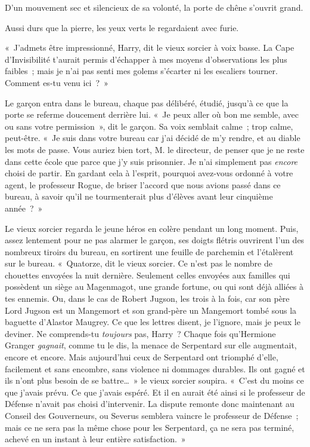 D'un mouvement sec et silencieux de sa volonté, la porte de chêne s'ouvrit grand.

Aussi durs que la pierre, les yeux verts le regardaient avec furie.

«~J'admets être impressionné, Harry, dit le vieux sorcier à voix basse. La Cape d'Invisibilité t'aurait permis d'échapper à mes moyens d'observations les plus faibles~; mais je n'ai pas senti mes golems s'écarter ni les escaliers tourner. Comment es-tu venu ici~?~»

Le garçon entra dans le bureau, chaque pas délibéré, étudié, jusqu'à ce que la porte se referme doucement derrière lui. «~Je peux aller où bon me semble, avec ou sans votre permission~», dit le garçon. Sa voix semblait calme~; trop calme, peut-être. «~Je suis dans votre bureau car j'ai décidé de m'y rendre, et au diable les mots de passe. Vous auriez bien tort, M. le directeur, de penser que je ne reste dans cette école que parce que j'y suis prisonnier. Je n'ai simplement pas \emph{encore} choisi de partir. En gardant cela à l'esprit, pourquoi avez-vous ordonné à votre agent, le professeur Rogue, de briser l'accord que nous avions passé dans ce bureau, à savoir qu'il ne tourmenterait plus d'élèves avant leur cinquième année~?~»

Le vieux sorcier regarda le jeune héros en colère pendant un long moment. Puis, assez lentement pour ne pas alarmer le garçon, ses doigts flétris ouvrirent l'un des nombreux tiroirs du bureau, en sortirent une feuille de parchemin et l'étalèrent sur le bureau. «~Quatorze, dit le vieux sorcier. Ce n'est pas le nombre de chouettes envoyées la nuit dernière. Seulement celles envoyées aux familles qui possèdent un siège au Magenmagot, une grande fortune, ou qui sont déjà alliées à tes ennemis. Ou, dans le cas de Robert Jugson, les trois à la fois, car son père Lord Jugson est un Mangemort et son grand-père un Mangemort tombé sous la baguette d'Alastor Maugrey. Ce que les lettres disent, je l'ignore, mais je peux le deviner. Ne comprends-tu \emph{toujours} pas, Harry~? Chaque fois qu'Hermione Granger \emph{gagnait}, comme tu le dis, la menace de Serpentard sur elle augmentait, encore et encore. Mais aujourd'hui ceux de Serpentard ont triomphé d'elle, facilement et sans encombre, sans violence ni dommages durables. Ils ont gagné et ils n'ont plus besoin de se battre…~» le vieux sorcier soupira. «~C'est du moins ce que j'avais prévu. Ce que j'avais espéré. Et il en aurait été ainsi si le professeur de Défense n'avait pas choisi d'intervenir. La dispute remonte donc maintenant au Conseil des Gouverneurs, ou Severus semblera vaincre le professeur de Défense~; mais ce ne sera pas la même chose pour les Serpentard, ça ne sera pas terminé, achevé en un instant à leur entière satisfaction.~»

